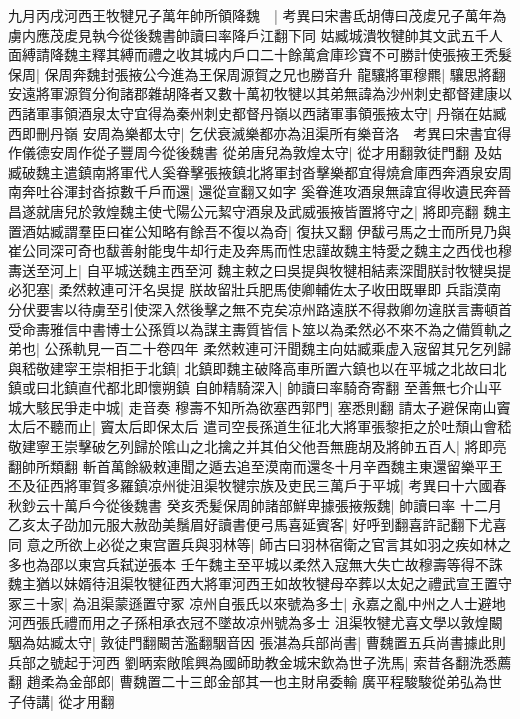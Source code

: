 九月丙戌河西王牧犍兄子萬年帥所領降魏　|{
	考異曰宋書氐胡傳曰茂䖍兄子萬年為虜内應茂䖍見執今從後魏書帥讀曰率降戶江翻下同}
姑臧城潰牧犍帥其文武五千人面縛請降魏主釋其縛而禮之收其城内戶口二十餘萬倉庫珍寶不可勝計使張掖王秃髮保周|{
	保周奔魏封張掖公今進為王保周源賀之兄也勝音升}
龍驤將軍穆羆|{
	驤思將翻}
安遠將軍源賀分徇諸郡雜胡降者又數十萬初牧犍以其弟無諱為沙州刺史都督建康以西諸軍事領酒泉太守宜得為秦州刺史都督丹嶺以西諸軍事領張掖太守|{
	丹嶺在姑臧西即刪丹嶺}
安周為樂都太守|{
	乞伏衰滅樂都亦為沮渠所有樂音洛　考異曰宋書宜得作儀德安周作從子豐周今從後魏書}
從弟唐兒為敦煌太守|{
	從才用翻敦徒門翻}
及姑臧破魏主遣鎮南將軍代人奚眷擊張掖鎮北將軍封沓擊樂都宜得燒倉庫西奔酒泉安周南奔吐谷渾封沓掠數千戶而還|{
	還從宣翻又如字}
奚眷進攻酒泉無諱宜得收遺民奔晉昌遂就唐兒於敦煌魏主使弋陽公元絜守酒泉及武威張掖皆置將守之|{
	將即亮翻}
魏主置酒姑臧謂羣臣曰崔公知略有餘吾不復以為奇|{
	復扶又翻}
伊馛弓馬之士而所見乃與崔公同深可奇也馛善射能曳牛却行走及奔馬而性忠謹故魏主特愛之魏主之西伐也穆夀送至河上|{
	自平城送魏主西至河}
魏主敕之曰吳提與牧犍相結素深聞朕討牧犍吳提必犯塞|{
	柔然敕連可汗名吳提}
朕故留壯兵肥馬使卿輔佐太子收田既畢即兵詣漠南分伏要害以待虜至引使深入然後擊之無不克矣凉州路遠朕不得救卿勿違朕言夀頓首受命夀雅信中書博士公孫質以為謀主夀質皆信卜筮以為柔然必不來不為之備質軌之弟也|{
	公孫軌見一百二十卷四年}
柔然敕連可汗聞魏主向姑臧乘虚入宼留其兄乞列歸與嵇敬建寜王崇相拒于北鎮|{
	北鎮即魏主破降高車所置六鎮也以在平城之北故曰北鎮或曰北鎮直代都北即懷朔鎮}
自帥精騎深入|{
	帥讀曰率騎奇寄翻}
至善無七介山平城大駭民爭走中城|{
	走音奏}
穆壽不知所為欲塞西郭門|{
	塞悉則翻}
請太子避保南山竇太后不聽而止|{
	竇太后即保太后}
遣司空長孫道生征北大將軍張黎拒之於吐頹山會嵇敬建寧王崇擊破乞列歸於隂山之北擒之并其伯父他吾無鹿胡及將帥五百人|{
	將即亮翻帥所類翻}
斬首萬餘級敕連聞之遁去追至漠南而還冬十月辛酉魏主東還留樂平王丕及征西將軍賀多羅鎮凉州徙沮渠牧犍宗族及吏民三萬戶于平城|{
	考異曰十六國春秋鈔云十萬戶今從後魏書}
癸亥秃髪保周帥諸部鮮卑據張掖叛魏|{
	帥讀曰率}
十二月乙亥太子劭加元服大赦劭美鬚眉好讀書便弓馬喜延賓客|{
	好呼到翻喜許記翻下尤喜同}
意之所欲上必從之東宫置兵與羽林等|{
	師古曰羽林宿衛之官言其如羽之疾如林之多也為邵以東宫兵弑逆張本}
壬午魏主至平城以柔然入寇無大失亡故穆壽等得不誅魏主猶以妹婿待沮渠牧犍征西大將軍河西王如故牧犍母卒葬以太妃之禮武宣王置守冢三十家|{
	為沮渠蒙遜置守冢}
凉州自張氏以來號為多士|{
	永嘉之亂中州之人士避地河西張氏禮而用之子孫相承衣冠不墜故凉州號為多士}
沮渠牧犍尤喜文學以敦煌闞駰為姑臧太守|{
	敦徒門翻闞苦濫翻駰音因}
張湛為兵部尚書|{
	曹魏置五兵尚書據此則兵部之號起于河西}
劉昞索敞隂興為國師助教金城宋欽為世子洗馬|{
	索昔各翻洗悉薦翻}
趙柔為金部郎|{
	曹魏置二十三郎金部其一也主財帛委輸}
廣平程駿駿從弟弘為世子侍講|{
	從才用翻}
